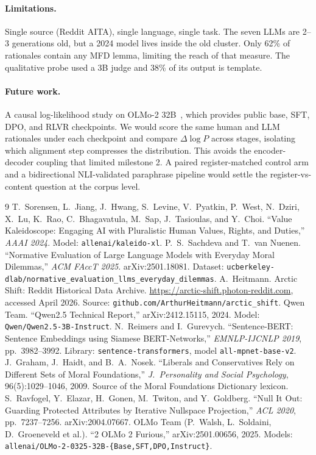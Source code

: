 \documentclass[11pt,a4paper]{article}
\begin{document}
\paragraph{Limitations.} Single source (Reddit AITA), single language, single task. The seven LLMs are 2--3 generations old, but a 2024 model lives inside the old cluster. Only 62\% of rationales contain any MFD lemma, limiting the reach of that measure. The qualitative probe used a 3B judge and 38\% of its output is template.

\paragraph{Future work.} A causal log-likelihood study on OLMo-2 32B~\cite{olmo2}, which provides public base, SFT, DPO, and RLVR checkpoints. We would score the same human and LLM rationales under each checkpoint and compare $\Delta \log P$ across stages, isolating which alignment step compresses the distribution. This avoids the encoder-decoder coupling that limited milestone 2. A paired register-matched control arm and a bidirectional NLI-validated paraphrase pipeline would settle the register-vs-content question at the corpus level.


\footnotesize
\begin{thebibliography}{9}
T.\ Sorensen, L.\ Jiang, J.\ Hwang, S.\ Levine, V.\ Pyatkin, P.\ West, N.\ Dziri, X.\ Lu, K.\ Rao, C.\ Bhagavatula, M.\ Sap, J.\ Tasioulas, and Y.\ Choi.
``Value Kaleidoscope: Engaging AI with Pluralistic Human Values, Rights, and Duties,'' \emph{AAAI 2024}. Model: \texttt{allenai/kaleido-xl}.
P.\ S.\ Sachdeva and T.\ van Nuenen.
``Normative Evaluation of Large Language Models with Everyday Moral Dilemmas,'' \emph{ACM FAccT 2025}. arXiv:2501.18081. Dataset: \texttt{ucberkeley-dlab/normative\_evaluation\_llms\_everyday\_dilemmas}.
A.\ Heitmann. Arctic Shift: Reddit Historical Data Archive. \url{https://arctic-shift.photon-reddit.com}, accessed April 2026. Source: \texttt{github.com/ArthurHeitmann/arctic\_shift}.
Qwen Team.
``Qwen2.5 Technical Report,'' arXiv:2412.15115, 2024. Model: \texttt{Qwen/Qwen2.5-3B-Instruct}.
N.\ Reimers and I.\ Gurevych.
``Sentence-BERT: Sentence Embeddings using Siamese BERT-Networks,'' \emph{EMNLP-IJCNLP 2019}, pp.\ 3982--3992. Library: \texttt{sentence-transformers}, model \texttt{all-mpnet-base-v2}.
J.\ Graham, J.\ Haidt, and B.\ A.\ Nosek.
``Liberals and Conservatives Rely on Different Sets of Moral Foundations,'' \emph{J.\ Personality and Social Psychology}, 96(5):1029--1046, 2009. Source of the Moral Foundations Dictionary lexicon.
S.\ Ravfogel, Y.\ Elazar, H.\ Gonen, M.\ Twiton, and Y.\ Goldberg.
``Null It Out: Guarding Protected Attributes by Iterative Nullspace Projection,'' \emph{ACL 2020}, pp.\ 7237--7256. arXiv:2004.07667.
OLMo Team (P.\ Walsh, L.\ Soldaini, D.\ Groeneveld et al.).
``2 OLMo 2 Furious,'' arXiv:2501.00656, 2025. Models: \texttt{allenai/OLMo-2-0325-32B-\{Base,SFT,DPO,Instruct\}}.
\end{thebibliography}
\end{document}
